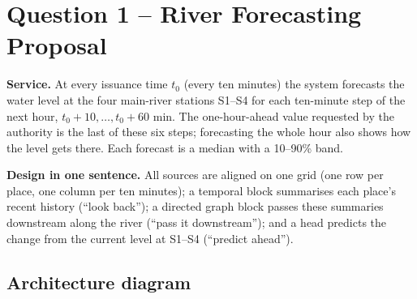 \section{Question 1 -- River Forecasting Proposal}

\textbf{Service.} At every issuance time $t_0$ (every ten minutes) the system forecasts the water level at the four main-river stations S1--S4 for each ten-minute step of the next hour, $t_0+10,\dots,t_0+60$ min. The one-hour-ahead value requested by the authority is the last of these six steps; forecasting the whole hour also shows how the level gets there. Each forecast is a median with a 10--90\% band.

\textbf{Design in one sentence.} All sources are aligned on one grid (one row per place, one column per ten minutes); a temporal block summarises each place's recent history (``look back''); a directed graph block passes these summaries downstream along the river (``pass it downstream''); and a head predicts the change from the current level at S1--S4 (``predict ahead'').

\subsection{Architecture diagram}


